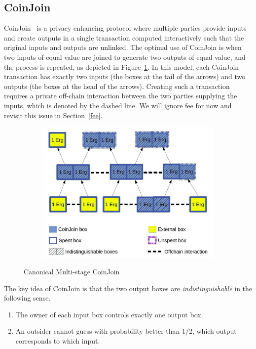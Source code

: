 \documentclass[11pt]{article}
\begin{document}
\subsection{CoinJoin} 
\label{coinjoin}
CoinJoin~\cite{coinjoin} is a privacy enhancing protocol where multiple parties provide inputs and create outputs in a single transaction computed interactively such that the original inputs and outputs are unlinked. The optimal use of CoinJoin is when two inputs of equal value are joined to generate two outputs of equal value, and the process is repeated, as depicted in Figure~\ref{fig:coinjoin}. 
In this model, each CoinJoin transaction has exactly two inputs (the boxes at the tail of the arrows) and two outputs (the boxes at the head of the arrows). Creating such a transaction requires a private off-chain interaction between the two parties supplying the inputs, which is denoted by the dashed line. We will ignore fee for now and revisit this issue in Section~\ref{fee}.

\begin{figure}
	\centering
	\begin{subfigure}{.6\textwidth}
		\centering
		\includegraphics[width=\linewidth]{CoinJoin.jpg}
	\end{subfigure}%
	\caption{Canonical Multi-stage CoinJoin}
	\label{fig:coinjoin}
\end{figure}

The key idea of CoinJoin is that the two output boxes are {\em indistinguishable} in the following sense. 
\begin{enumerate}
    \item The owner of each input box controls exactly one output box.
    \item An outsider cannot guess with probability better than 1/2, which output corresponds to which input.
\end{enumerate}
\end{document}
